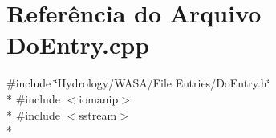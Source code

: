 \section{Referência do Arquivo Do\+Entry.\+cpp}
\label{_do_entry_8cpp}
{\ttfamily \#include \char`\"{}Hydrology/\+W\+A\+S\+A/\+File Entries/\+Do\+Entry.\+h\char`\"{}}\\*
{\ttfamily \#include $<$iomanip$>$}\\*
{\ttfamily \#include $<$sstream$>$}\\*
